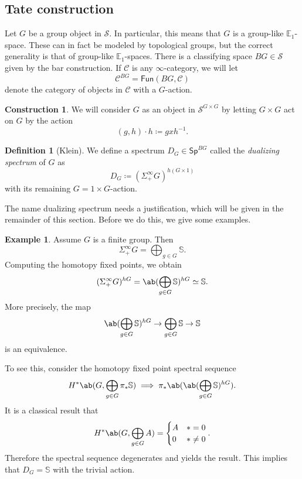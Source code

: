 \documentclass[10pt]{amsart}
\theoremstyle{definition}
\newtheorem{defn}[thm]{Definition}
\newtheorem{con}[thm]{Construction}
\newtheorem{exm}[thm]{Example}
\theoremstyle{remark}
\theoremstyle{plain}
\theoremstyle{definition}
\theoremstyle{remark}
\newcommand{\E}{\mathbb{E}}
\newcommand{\bS}{\mathbb{S}}
\newcommand{\mc}[1]{\mathcal{#1}}
\newcommand{\ms}[1]{\mathsf{#1}}
\newcommand{\1}{\mathbf{1}}
\newcommand{\2}{\mathbf{2}}
\newcommand{\3}{\mathbf{3}}
\begin{document}
\subsection{Tate construction}%
\label{sub:Tate construction}

Let $G$ be a group object in $\mc{S}$. In particular, this means that $G$ is a group-like $\E_1$-space. These can in fact be modeled by topological groups, but the correct generality is that of group-like $\E_1$-spaces. There is a classifying space $BG \in \mc{S}$ given by the bar construction. If $\mc{C}$ is any $\infty$-category, we will let
\[ \mc{C}^{BG} = \ms{Fun}(BG, \mc{C}) \]
denote the category of objects in $\mc{C}$ with a $G$-action.

\begin{con}
    We will consider $G$ as an object in $\mc{S}^{G \times G}$ by letting $G \times G$ act on $G$ by the action 
    \[ (g,h) \cdot h \coloneqq gxh^{-1}. \]
\end{con}

\begin{defn}[Klein]
    We define a spectrum $D_G \in \ms{Sp}^{BG}$ called the \textit{dualizing spectrum} of $G$ as
    \[ D_G \coloneqq (\Sigma_+^{\infty} G)^{h(G \times 1)} \]
    with its remaining $G = 1 \times G$-action.
\end{defn}

The name dualizing spectrum needs a justification, which will be given in the remainder of this section. Before we do this, we give some examples.

\begin{exm}
    Assume $G$ is a finite group. Then
    \[ \Sigma_+^{\infty} G = \bigoplus_{g \in G} \bS. \]
    Computing the homotopy fixed points, we obtain
    \[ (\Sigma_+^{\infty} G)^{hG} = \ab(\bigoplus_{g \in G} \bS)^{hG} \simeq \bS. \]
    More precisely, the map
    \[ \ab(\bigoplus_{g \in G} \bS)^{hG} \to \bigoplus_{g \in G} \bS \to \bS \]
    is an equivalence.

    To see this, consider the homotopy fixed point spectral sequence
    \[ H^* \ab(G, \bigoplus_{g \in G} \pi_* \bS) \implies \pi_* \ab(\ab(\bigoplus_{g \in G} \bS)^{hG}). \]
    It is a classical result that
    \[ H^*\ab(G, \bigoplus_{g \in G} A) = \begin{cases}
        A & *=0 \\
        0 & * \neq 0
    \end{cases}. \]
    Therefore the spectral sequence degenerates and yields the result. This implies that $D_G = \bS$ with the trivial action.
\end{exm}
\end{document}
